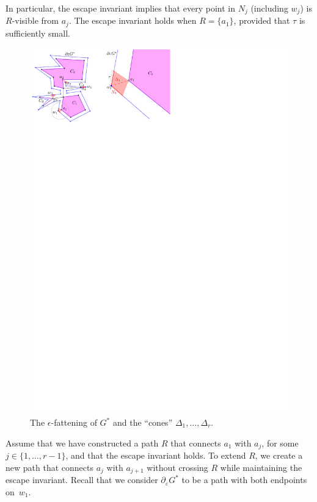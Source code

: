 \documentclass[11pt]{patmorin}
\begin{document}
In particular, the escape invariant implies that every point in $N_j$ (including $w_j$) is $R$-visible from $a_j$. The escape invariant holds when $R=\{a_1\}$, provided that $\tau$ is sufficiently small.

\begin{figure}[tb]
\centering
\includegraphics{img/Neighborhood.pdf}
\caption{The $\epsilon$-fattening of $G^*$ and the ``cones'' $\Delta_1,\ldots,\Delta_r$.}
\label{fig:Neighborhood}
\end{figure}

Assume that we have constructed a path $R$ that connects $a_1$ with $a_j$, for some $j\in\{1,\ldots,r-1\}$, and that the escape invariant holds.  To extend $R$, we create a new path that connects $a_j$ with $a_{j+1}$ without crossing $R$ while maintaining the escape invariant.  Recall that we consider $\partial_\varepsilon G^*$ to be a path with both endpoints on~$w_1$.
\end{document}
